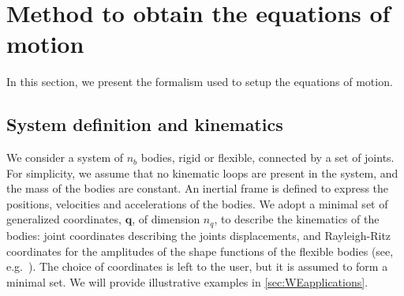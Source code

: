 \documentclass[wes, manuscript]{copernicus}
\renewcommand{\v}[1]{\boldsymbol{#1}}
\begin{document}




\section{Method to obtain the equations of motion}
\label{sec:method}

In this section, we present the formalism used to setup the equations of motion. 

\subsection{System definition and kinematics}
We consider a system of $n_b$ bodies, rigid or flexible, connected by a set of joints. For simplicity, we assume that no kinematic loops are present in the system, and the mass of the bodies are constant. An inertial frame is defined to express the positions, velocities and accelerations of the bodies. We adopt a minimal set of generalized coordinates, $\v{q}$, of dimension $n_q$, to describe the kinematics of the bodies: joint coordinates describing the joints displacements, and Rayleigh-Ritz coordinates for the amplitudes of the shape functions of the flexible bodies (see, e.g.~\cite{branlard:2019flex}).
The choice of coordinates is left to the user, but it is assumed to form a minimal set. We will provide illustrative examples in \autoref{sec:WEapplications}.
\end{document}
